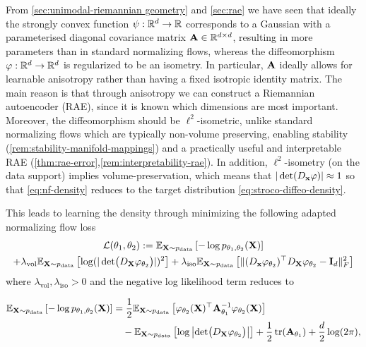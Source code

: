 From \ref{sec:unimodal-riemannian geometry} and \ref{sec:rae} we have seen that ideally the strongly convex function $\psi: \mathbb{R}^{d} \to \mathbb{R}$ corresponds to a Gaussian with a parameterised diagonal covariance matrix $\mathbf{A} \in \mathbb{R}^{d\times d}$, resulting in more parameters than in standard normalizing flows, whereas the diffeomorphism $\varphi: \mathbb{R}^{d} \to \mathbb{R}^{d}$ is regularized to be an isometry. In particular, $\mathbf{A}$ ideally allows for learnable anisotropy rather than having a fixed isotropic identity matrix. The main reason is that through anisotropy we can construct a Riemannian autoencoder (RAE), since it is known which dimensions are most important. Moreover, the diffeomorphism should be $\ell^2$-isometric, unlike standard normalizing flows which are typically non-volume preserving, enabling stability (\ref{rem:stability-manifold-mappings}) and a practically useful and interpretable RAE  (\ref{thm:rae-error},\ref{rem:interpretability-rae}). In addition, $\ell^2$-isometry (on the data support) implies volume-preservation, which means that $|\det(D_{\mathbf{x}} \varphi)| \approx 1$ so that \ref{eq:nf-density} reduces to the target distribution \ref{eq:stroco-diffeo-density}.

This leads to learning the density through minimizing the following adapted normalizing flow loss
\begin{multline}\label{eq:basic_training_objective}
    \mathcal{L}(\theta_1, \theta_2) := \mathbb{E}_{\mathbf{X} \sim p_{\text{data}}}\left[-\log p_{\theta_1, \theta_2}(\mathbf{X})\right] \\
    + \lambda_{\text{vol}} \mathbb{E}_{\mathbf{X} \sim p_{\text{data}}}\left[ \log(|\det \bigl( D_{\mathbf{X}} \varphi_{\theta_2} \bigr)|)^2 \right] +
    \lambda_{\text{iso}} \mathbb{E}_{\mathbf{X} \sim p_{\text{data}}}\left[ \|  (D_{\mathbf{x}} \varphi_{\theta_2})^\top D_{\mathbf{X}} \varphi_{\theta_2}  - \mathbf{I}_d\|_F^2 \right]
\end{multline}
where $\lambda_{\text{vol}}, \lambda_{\text{iso}} >0$ and the negative log likelihood term reduces to

\begin{align}
    \mathbb{E}_{\mathbf{X} \sim p_{\text{data}}}\left[-\log p_{\theta_1, \theta_2}(\mathbf{X})\right] 
    &= \frac{1}{2}\mathbb{E}_{\mathbf{X} \sim p_{\text{data}}}\left[\varphi_{\theta_2}(\mathbf{X})^\top \mathbf{A}_{\theta_1}^{-1} \varphi_{\theta_2}(\mathbf{X}) \right] \notag \\
    &\quad - \mathbb{E}_{\mathbf{X} \sim p_{\text{data}}}\left[ \log\left|\det \bigl( D_{\mathbf{X}} \varphi_{\theta_2} \bigr)\right| \right] + \frac{1}{2} \operatorname{tr}(\mathbf{A}_{\theta_1}) + \frac{d}{2}\log(2\pi),
    \end{align}
    



